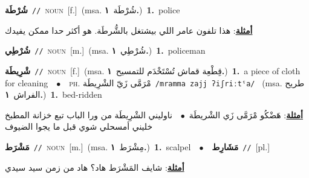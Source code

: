 \documentclass[10pt,a4paper,twoside]{article} %
\begin{document}
\begin{multicols}{2}
{\setlength\topsep{0pt}\textbf{\foreignlanguage{arabic}{شُرْطَة}}\ {\color{gray}\texttt{//}\color{black}}\ \textsc{noun}\ [f.]\ \color{gray}(msa. \foreignlanguage{arabic}{شُرْطَة}~\foreignlanguage{arabic}{\textbf{١.}})\color{black}\ \textbf{1.}~police\  \begin{flushright}\color{gray}\foreignlanguage{arabic}{\textbf{\underline{\foreignlanguage{arabic}{أمثلة}}}: هذا تلفون عامر اللي بيشتغل بالشُّرطَة. هو أكثر حدا ممكن يفيدك}\end{flushright}\color{black}} \vspace{2mm}

{\setlength\topsep{0pt}\textbf{\foreignlanguage{arabic}{شُرْطِي}}\ {\color{gray}\texttt{//}\color{black}}\ \textsc{noun}\ [m.]\ \color{gray}(msa. \foreignlanguage{arabic}{شُرْطِي}~\foreignlanguage{arabic}{\textbf{١.}})\color{black}\ \textbf{1.}~policeman\ } \vspace{2mm}

{\setlength\topsep{0pt}\textbf{\foreignlanguage{arabic}{شْرِيطَة}}\ {\color{gray}\texttt{//}\color{black}}\ \textsc{noun}\ [f.]\ \color{gray}(msa. \foreignlanguage{arabic}{قِطْعِة قماش تُسْتَخْدَم للتمسيح}~\foreignlanguage{arabic}{\textbf{١.}})\color{black}\ \textbf{1.}~a piece of cloth for cleaning\ \ $\bullet$\ \ \textsc{ph.} \color{gray} \foreignlanguage{arabic}{مْرَمَّى زَيّ الشْرِيطَة}\color{black}\ {\color{gray}\texttt{/{\sffamily mramma zajj ʔiʃriːtˤa}/}\color{black}}\ \color{gray} (msa. \foreignlanguage{arabic}{طريح الفراش}~\foreignlanguage{arabic}{\textbf{١.}})\color{black}\ \textbf{1.}~bed-ridden\  \begin{flushright}\color{gray}\foreignlanguage{arabic}{\textbf{\underline{\foreignlanguage{arabic}{أمثلة}}}: هَضْكُو مْرَمَّى زَي الشْريطَة\ $\bullet$\ \  ناوليني الشْرِيطَة من ورا الباب تبع خزانة المطبخ خليني أمسحلي شوي قبل ما يجوا الضيوف}\end{flushright}\color{black}} \vspace{2mm}

{\setlength\topsep{0pt}\textbf{\foreignlanguage{arabic}{مَشْرَط}}\ {\color{gray}\texttt{//}\color{black}}\ \textsc{noun}\ [m.]\ \color{gray}(msa. \foreignlanguage{arabic}{مِشْرَط}~\foreignlanguage{arabic}{\textbf{١.}})\color{black}\ \textbf{1.}~scalpel\ \ $\bullet$\ \ \setlength\topsep{0pt}\textbf{\foreignlanguage{arabic}{مَشَارِط}}\ {\color{gray}\texttt{//}\color{black}}\ [pl.]\  \begin{flushright}\color{gray}\foreignlanguage{arabic}{\textbf{\underline{\foreignlanguage{arabic}{أمثلة}}}: شايف المَشْرَط هاد؟ هاد من زمن سيد سيدي}\end{flushright}\color{black}} \vspace{2mm}


\end{multicols}
\end{document}
